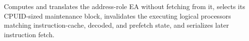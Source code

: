Computes and translates the address-role EA without fetching from it, selects its CPUID-sized maintenance block, invalidates the executing logical processor\textquotesingle{}s matching instruction-cache, decoded, and prefetch state, and serializes later instruction fetch.
